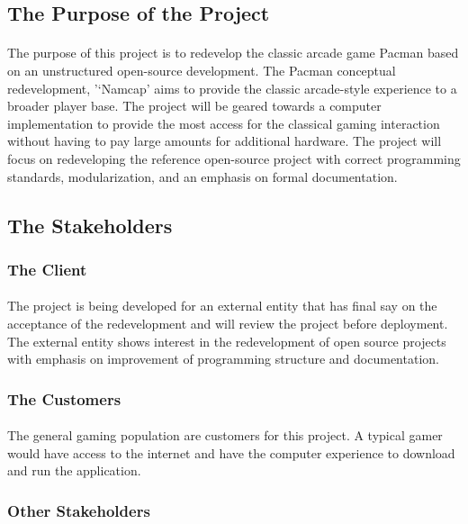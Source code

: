 \documentclass[12pt, titlepage]{article}
\begin{document}
\subsection{The Purpose of the Project}
\paragraph{}
The purpose of this project is to redevelop the classic arcade game Pacman based on an unstructured open-source development. The Pacman conceptual redevelopment, '‘Namcap' aims to provide the classic arcade-style experience to a broader player base. The project will be geared towards a computer implementation to provide the most access for the classical gaming interaction without having to pay large amounts for additional hardware. The project will focus on redeveloping the reference open-source project with correct programming standards, modularization, and an emphasis on formal documentation.

\subsection{The Stakeholders}

\subsubsection{The Client}
\paragraph{}
The project is being developed for an external entity that has final say on the acceptance of the redevelopment and will review the project before deployment. The external entity shows interest in the redevelopment of open source projects with emphasis on improvement of programming structure and documentation.

\subsubsection{The Customers}
\paragraph{}
The general gaming population are customers for this project. A typical gamer would have access to the internet and have the computer experience to download and run the application. 

\subsubsection{Other Stakeholders}
\end{document}
